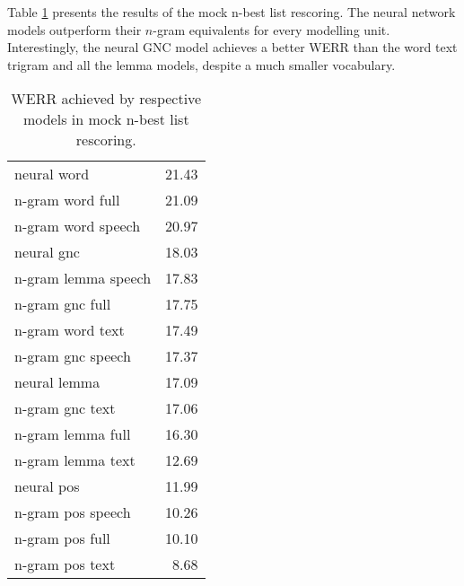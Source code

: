 Table \ref{table:max_werr_mock} presents the results of the mock n-best list rescoring. The neural network models outperform their \mbox{$n$-gram} equivalents for every modelling unit. Interestingly, the neural GNC model achieves a better WERR than the word text trigram and all the lemma models, despite a much smaller vocabulary.
\begin{table}[!htbp]
	\centering
	\caption[WERR achieved by respective models in mock \mbox{n-best} list rescoring]{WERR achieved by respective models in mock \mbox{n-best} list rescoring.}
	\label{table:max_werr_mock}
	\begin{tabular*}{.4\linewidth}{@{\extracolsep{\fill}}lr}
		neural word   & 21.43\\
		n-gram word full  & 21.09\\
		n-gram word speech  & 20.97\\
		neural gnc    & 18.03\\
		n-gram lemma speech  & 17.83\\
		n-gram gnc full  & 17.75\\
		n-gram word text  & 17.49\\
		n-gram gnc speech  & 17.37\\
		neural lemma  & 17.09\\
		n-gram gnc text  & 17.06\\
		n-gram lemma full  & 16.30\\
		n-gram lemma text  & 12.69\\
		neural pos    & 11.99\\
		n-gram pos speech  & 10.26\\
		n-gram pos full  & 10.10\\
		n-gram pos text  & 8.68\\
	\end{tabular*}
\end{table}
